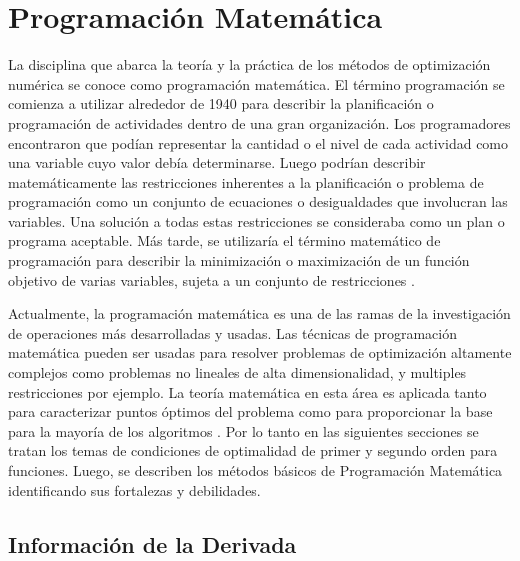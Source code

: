 
\chapter{Programación Matemática} %

\label{Chapter3} %
La disciplina que abarca la teoría y la práctica de los métodos de optimización numérica se conoce como programación matemática\cite{antoniou_practical_2007}. El término programación se comienza a utilizar alrededor de 1940 para describir la planificación o programación de actividades dentro de una gran organización. Los programadores encontraron que podían representar la cantidad o el nivel de cada actividad como una variable cuyo valor debía determinarse. Luego podrían describir matemáticamente las restricciones inherentes a la planificación o problema de programación como un conjunto de ecuaciones o desigualdades que involucran las variables. Una solución a todas estas restricciones se consideraba como un plan o programa aceptable. Más tarde, se utilizaría el término matemático
de programación para describir la minimización o maximización de un
función objetivo de varias variables, sujeta a un conjunto de restricciones \cite{takriti1994ampl}. 

Actualmente, la programación matemática es una de las ramas de la investigación de operaciones más desarrolladas y usadas. Las técnicas de programación matemática pueden ser usadas para resolver  problemas de optimización altamente complejos como problemas no lineales de alta dimensionalidad, y multiples restricciones por ejemplo. La teoría matemática en esta área es aplicada tanto para caracterizar puntos óptimos del problema como para proporcionar la base para la mayoría de los algoritmos \cite{nocedal2006numerical}. Por lo tanto en las siguientes secciones se tratan los temas de condiciones de optimalidad de primer y segundo orden para funciones. Luego, se describen los métodos básicos de Programación Matemática identificando sus fortalezas y debilidades.

\section{Información de la Derivada}

